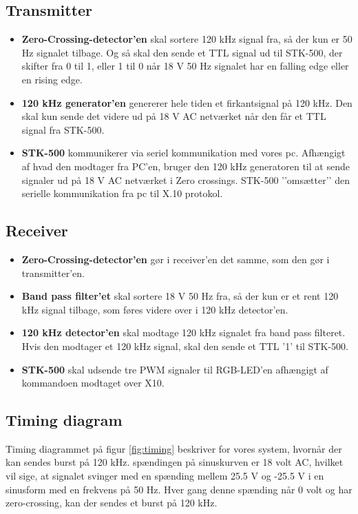 \documentclass[oneside]{memoir}
\begin{document}
\subsection{Transmitter}
\begin{itemize}
	\item \textbf{Zero-Crossing-detector’en} skal sortere 120 kHz signal fra, så der kun er 50 Hz signalet tilbage. Og så skal den sende et TTL signal ud til STK-500, der skifter fra 0 til 1, eller 1 til 0 når 18 V 50 Hz signalet har en falling edge eller en rising edge.
	\item \textbf{120 kHz generator’en} genererer hele tiden et firkantsignal på 120 kHz. Den skal kun sende det videre ud på 18 V AC netværket når den får et TTL signal fra STK-500.
	\item \textbf{STK-500} kommunikerer via seriel kommunikation med vores pc. Afhængigt af hvad den modtager fra PC’en, bruger den 120 kHz generatoren til at sende signaler ud på 18 V AC netværket i Zero crossings. STK-500 ’’omsætter’’ den serielle kommunikation fra pc til X.10 protokol.
\end{itemize}
\subsection{Receiver}
\begin{itemize}
	\item \textbf{Zero-Crossing-detector’en} gør i receiver’en det samme, som den gør i transmitter’en.
	\item \textbf{Band pass filter’et} skal sortere 18 V 50 Hz fra, så der kun er et rent 120 kHz signal tilbage, som føres videre over i 120 kHz detector’en. 
	\item \textbf{120 kHz detector’en} skal modtage 120 kHz signalet fra band pass filteret. Hvis den modtager et 120 kHz signal, skal den sende et TTL ’1’ til STK-500. 
	\item \textbf{STK-500} skal udsende tre PWM signaler til RGB-LED’en afhængigt af kommandoen modtaget over X10. 
	
\end{itemize}
\newpage
\subsection{Timing diagram}
Timing diagrammet på figur \ref{fig:timing} beskriver for vores system, hvornår der kan sendes burst på 120 kHz. spændingen på sinuskurven er 18 volt AC, hvilket vil sige, at signalet svinger med en spænding mellem 25.5 V og -25.5 V i en sinusform med en frekvens på 50 Hz. Hver gang denne spænding når 0 volt og har zero-crossing, kan der sendes et burst på 120 kHz.
\end{document}
